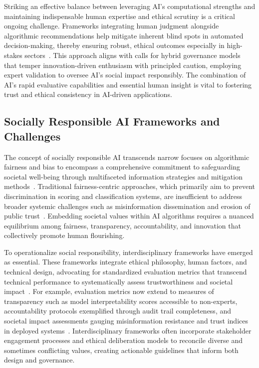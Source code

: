 \documentclass[sigconf]{acmart}
\begin{document}
Striking an effective balance between leveraging AI's computational strengths and maintaining indispensable human expertise and ethical scrutiny is a critical ongoing challenge. Frameworks integrating human judgment alongside algorithmic recommendations help mitigate inherent blind spots in automated decision-making, thereby ensuring robust, ethical outcomes especially in high-stakes sectors~\cite{ref2}. This approach aligns with calls for hybrid governance models that temper innovation-driven enthusiasm with principled caution, employing expert validation to oversee AI’s social impact responsibly. The combination of AI's rapid evaluative capabilities and essential human insight is vital to fostering trust and ethical consistency in AI-driven applications.

\subsection{Socially Responsible AI Frameworks and Challenges}

The concept of socially responsible AI transcends narrow focuses on algorithmic fairness and bias to encompass a comprehensive commitment to safeguarding societal well-being through multifaceted information strategies and mitigation methods~\cite{ref26}. Traditional fairness-centric approaches, which primarily aim to prevent discrimination in scoring and classification systems, are insufficient to address broader systemic challenges such as misinformation dissemination and erosion of public trust~\cite{ref26}. Embedding societal values within AI algorithms requires a nuanced equilibrium among fairness, transparency, accountability, and innovation that collectively promote human flourishing.

To operationalize social responsibility, interdisciplinary frameworks have emerged as essential. These frameworks integrate ethical philosophy, human factors, and technical design, advocating for standardized evaluation metrics that transcend technical performance to systematically assess trustworthiness and societal impact~\cite{ref26}. For example, evaluation metrics now extend to measures of transparency such as model interpretability scores accessible to non-experts, accountability protocols exemplified through audit trail completeness, and societal impact assessments gauging misinformation resistance and trust indices in deployed systems~\cite{ref26}. Interdisciplinary frameworks often incorporate stakeholder engagement processes and ethical deliberation models to reconcile diverse and sometimes conflicting values, creating actionable guidelines that inform both design and governance.
\end{document}
